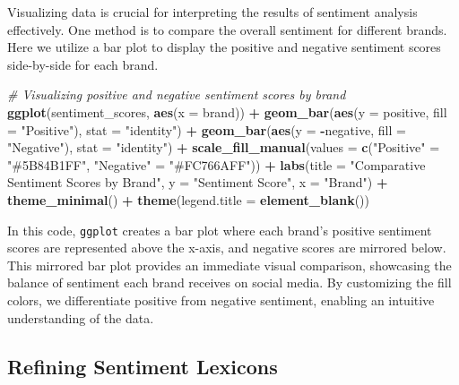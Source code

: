 \documentclass[
]{book}
\newenvironment{Shaded}{\begin{snugshade}}{\end{snugshade}}
\newcommand{\AttributeTok}[1]{\textcolor[rgb]{0.13,0.29,0.53}{#1}}
\newcommand{\CommentTok}[1]{\textcolor[rgb]{0.56,0.35,0.01}{\textit{#1}}}
\newcommand{\FunctionTok}[1]{\textcolor[rgb]{0.13,0.29,0.53}{\textbf{#1}}}
\newcommand{\NormalTok}[1]{#1}
\newcommand{\OtherTok}[1]{\textcolor[rgb]{0.56,0.35,0.01}{#1}}
\newcommand{\SpecialCharTok}[1]{\textcolor[rgb]{0.81,0.36,0.00}{\textbf{#1}}}
\newcommand{\StringTok}[1]{\textcolor[rgb]{0.31,0.60,0.02}{#1}}
\begin{document}
Visualizing data is crucial for interpreting the results of sentiment analysis effectively. One method is to compare the overall sentiment for different brands. Here we utilize a bar plot to display the positive and negative sentiment scores side-by-side for each brand.

\begin{Shaded}
\begin{Highlighting}[]
\CommentTok{\# Visualizing positive and negative sentiment scores by brand}
\FunctionTok{ggplot}\NormalTok{(sentiment\_scores, }\FunctionTok{aes}\NormalTok{(}\AttributeTok{x =}\NormalTok{ brand)) }\SpecialCharTok{+}
  \FunctionTok{geom\_bar}\NormalTok{(}\FunctionTok{aes}\NormalTok{(}\AttributeTok{y =}\NormalTok{ positive, }\AttributeTok{fill =} \StringTok{"Positive"}\NormalTok{), }\AttributeTok{stat =} \StringTok{"identity"}\NormalTok{) }\SpecialCharTok{+}
  \FunctionTok{geom\_bar}\NormalTok{(}\FunctionTok{aes}\NormalTok{(}\AttributeTok{y =} \SpecialCharTok{{-}}\NormalTok{negative, }\AttributeTok{fill =} \StringTok{"Negative"}\NormalTok{), }\AttributeTok{stat =} \StringTok{"identity"}\NormalTok{) }\SpecialCharTok{+}
  \FunctionTok{scale\_fill\_manual}\NormalTok{(}\AttributeTok{values =} \FunctionTok{c}\NormalTok{(}\StringTok{"Positive"} \OtherTok{=} \StringTok{"\#5B84B1FF"}\NormalTok{, }\StringTok{"Negative"} \OtherTok{=} \StringTok{"\#FC766AFF"}\NormalTok{)) }\SpecialCharTok{+}
  \FunctionTok{labs}\NormalTok{(}\AttributeTok{title =} \StringTok{"Comparative Sentiment Scores by Brand"}\NormalTok{,}
       \AttributeTok{y =} \StringTok{"Sentiment Score"}\NormalTok{,}
       \AttributeTok{x =} \StringTok{"Brand"}\NormalTok{) }\SpecialCharTok{+}
  \FunctionTok{theme\_minimal}\NormalTok{() }\SpecialCharTok{+}
  \FunctionTok{theme}\NormalTok{(}\AttributeTok{legend.title =} \FunctionTok{element\_blank}\NormalTok{())}
\end{Highlighting}
\end{Shaded}

In this code, \texttt{ggplot} creates a bar plot where each brand's positive sentiment scores are represented above the x-axis, and negative scores are mirrored below. This mirrored bar plot provides an immediate visual comparison, showcasing the balance of sentiment each brand receives on social media. By customizing the fill colors, we differentiate positive from negative sentiment, enabling an intuitive understanding of the data.

\hypertarget{refining-sentiment-lexicons}{%
\subsection{Refining Sentiment Lexicons}\label{refining-sentiment-lexicons}}
\end{document}
